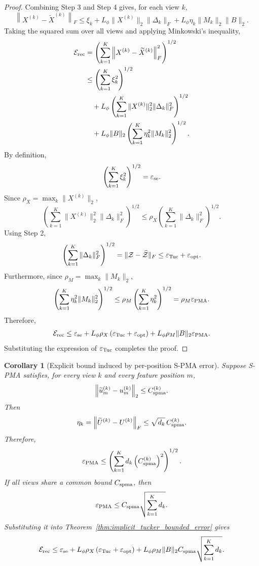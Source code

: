 \documentclass[11pt]{article}
\newtheorem{corollary}{Corollary}
\begin{document}
\begin{proof}
	Combining Step 3 and Step 4 gives, for each view $k$,
	\[
	\left\|
	X^{(k)}-\widetilde X^{(k)}
	\right\|_F
	\le
	\xi_k
	+
	L_\phi
	\|X^{(k)}\|_2
	\|\Delta_k\|_F
	+
	L_\phi
	\eta_k
	\|M_k\|_2
	\|B\|_2 .
	\]
	Taking the squared sum over all views and applying Minkowski's inequality,
	\[
	\begin{aligned}
		\mathcal E_{\rm rec}
		&=
		\left(
		\sum_{k=1}^{K}
		\left\|
		X^{(k)}-\widetilde X^{(k)}
		\right\|_F^2
		\right)^{1/2}\\
		&\le
		\left(
		\sum_{k=1}^{K}
		\xi_k^2
		\right)^{1/2}\\
		&\quad+
		L_\phi
		\left(
		\sum_{k=1}^{K}
		\|X^{(k)}\|_2^2
		\|\Delta_k\|_F^2
		\right)^{1/2}\\
		&\quad+
		L_\phi
		\|B\|_2
		\left(
		\sum_{k=1}^{K}
		\eta_k^2
		\|M_k\|_2^2
		\right)^{1/2}.
	\end{aligned}
	\]
	By definition,
	\[
	\left(
	\sum_{k=1}^{K}
	\xi_k^2
	\right)^{1/2}
	=
	\varepsilon_{\rm se}.
	\]
	Since $\rho_X=\max_k\|X^{(k)}\|_2$,
	\[
	\left(
	\sum_{k=1}^{K}
	\|X^{(k)}\|_2^2
	\|\Delta_k\|_F^2
	\right)^{1/2}
	\le
	\rho_X
	\left(
	\sum_{k=1}^{K}
	\|\Delta_k\|_F^2
	\right)^{1/2}.
	\]
	Using Step 2,
	\[
	\left(
	\sum_{k=1}^{K}
	\|\Delta_k\|_F^2
	\right)^{1/2}
	=
	\|\mathcal Z-\widehat{\mathcal Z}\|_F
	\le
	\varepsilon_{\rm Tuc}
	+
	\varepsilon_{\rm opt}.
	\]
	Furthermore, since $\rho_M=\max_k\|M_k\|_2$,
	\[
	\left(
	\sum_{k=1}^{K}
	\eta_k^2
	\|M_k\|_2^2
	\right)^{1/2}
	\le
	\rho_M
	\left(
	\sum_{k=1}^{K}
	\eta_k^2
	\right)^{1/2}
	=
	\rho_M
	\varepsilon_{\rm PMA}.
	\]
	Therefore,
	\[
	\mathcal E_{\rm rec}
	\le
	\varepsilon_{\rm se}
	+
	L_\phi \rho_X
	\left(
	\varepsilon_{\rm Tuc}
	+
	\varepsilon_{\rm opt}
	\right)
	+
	L_\phi \rho_M \|B\|_2
	\varepsilon_{\rm PMA}.
	\]
	Substituting the expression of $\varepsilon_{\rm Tuc}$ completes the proof.
\end{proof}

\begin{corollary}[Explicit bound induced by per-position S-PMA error]
	\label{cor:spma_to_recon}
	Suppose S-PMA satisfies, for every view $k$ and every feature position $m$,
	\[
	\left\|
	\widetilde u_m^{(k)}-u_m^{(k)}
	\right\|_2
	\le
	C_{\rm spma}^{(k)} .
	\]
	Then
	\[
	\eta_k
	=
	\left\|
	\widetilde U^{(k)}-U^{(k)}
	\right\|_F
	\le
	\sqrt{d_k}\,C_{\rm spma}^{(k)}.
	\]
	Therefore,
	\[
	\varepsilon_{\rm PMA}
	\le
	\left(
	\sum_{k=1}^{K}
	d_k
	\left(C_{\rm spma}^{(k)}\right)^2
	\right)^{1/2}.
	\]
	If all views share a common bound $C_{\rm spma}$, then
	\[
	\varepsilon_{\rm PMA}
	\le
	C_{\rm spma}
	\sqrt{
		\sum_{k=1}^{K}d_k
	}.
	\]
	Substituting it into Theorem~\ref{thm:implicit_tucker_bounded_error} gives
	\[
	\mathcal E_{\rm rec}
	\le
	\varepsilon_{\rm se}
	+
	L_\phi \rho_X
	\left(
	\varepsilon_{\rm Tuc}
	+
	\varepsilon_{\rm opt}
	\right)
	+
	L_\phi \rho_M\|B\|_2
	C_{\rm spma}
	\sqrt{
		\sum_{k=1}^{K}d_k
	}.
	\]
\end{corollary}
\end{document}
